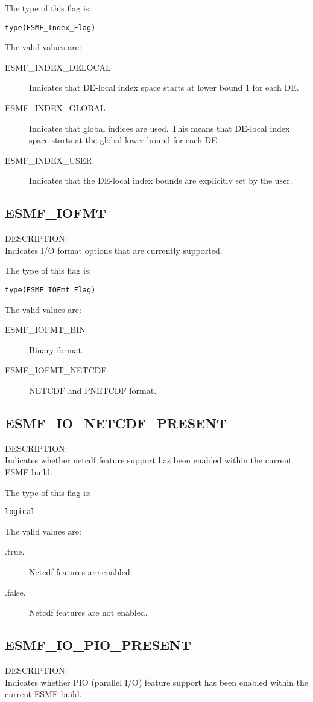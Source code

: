 The type of this flag is:

{\tt type(ESMF\_Index\_Flag)}

The valid values are:
\begin{description}
\item [ESMF\_INDEX\_DELOCAL]
      Indicates that DE-local index space starts at lower bound 1 for each DE.
\item [ESMF\_INDEX\_GLOBAL]
      Indicates that global indices are used. This means that DE-local index
      space starts at the global lower bound for each DE.
\item [ESMF\_INDEX\_USER]
      Indicates that the DE-local index bounds are explicitly set by the user.
 \end{description}

\subsection{ESMF\_IOFMT}
\label{opt:iofmtflag}
{\sf DESCRIPTION:\\}
Indicates I/O format options that are currently supported.

The type of this flag is:

{\tt type(ESMF\_IOFmt\_Flag)}

The valid values are:
\begin{description}
\item [ESMF\_IOFMT\_BIN]
      Binary format.
\item [ESMF\_IOFMT\_NETCDF]
      NETCDF and PNETCDF format.
\end{description}

\subsection{ESMF\_IO\_NETCDF\_PRESENT}
\label{const:ionetcdfflag}
{\sf DESCRIPTION:\\}
Indicates whether netcdf feature support has been enabled
within the current ESMF build.

The type of this flag is:

{\tt logical}

The valid values are:
\begin{description}
\item [.true.]
      Netcdf features are enabled.
\item [.false.]
      Netcdf features are not enabled.
\end{description}

\subsection{ESMF\_IO\_PIO\_PRESENT}
\label{const:iopioflag}
{\sf DESCRIPTION:\\}
Indicates whether PIO (parallel I/O) feature support has been enabled
within the current ESMF build.

